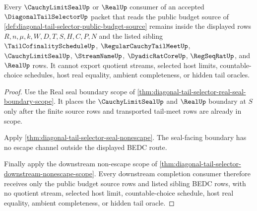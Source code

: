 \begin{theorem}
\label{thm:diagonal-tail-selector-real-seal-budget-nonescape}
Every $\CauchyLimitSealUp$ or $\RealUp$ consumer of an accepted
$\DiagonalTailSelectorUp$ packet that reads the public budget source of
\autoref{def:diagonal-tail-selector-public-budget-source} remains inside
the displayed rows $R,n,\mu,k,W,D,T,S,H,C,P,N$ and the listed sibling
$\TailCofinalityScheduleUp$, $\RegularCauchyTailMeetUp$,
$\CauchyLimitSealUp$, $\StreamNameUp$, $\DyadicRatCoreUp$,
$\RegSeqRatUp$, and $\RealUp$ rows. It cannot export quotient streams,
selected host limits, countable-choice schedules, host real equality,
ambient completeness, or hidden tail oracles.
\end{theorem}
\begin{proof}
Use the Real seal boundary scope of
\autoref{thm:diagonal-tail-selector-real-seal-boundary-scope}. It places the
$\CauchyLimitSealUp$ and $\RealUp$ boundary at $S$ only after the finite
source rows and transported tail-meet rows are already in scope.

Apply \autoref{thm:diagonal-tail-selector-seal-nonescape}. The seal-facing
boundary has no escape channel outside the displayed BEDC route.

Finally apply the downstream non-escape scope of
\autoref{thm:diagonal-tail-selector-downstream-nonescape-scope}. Every
downstream completion consumer therefore receives only the public budget
source rows and listed sibling BEDC rows, with no quotient stream, selected
host limit, countable-choice schedule, host real equality, ambient
completeness, or hidden tail oracle.
\end{proof}

